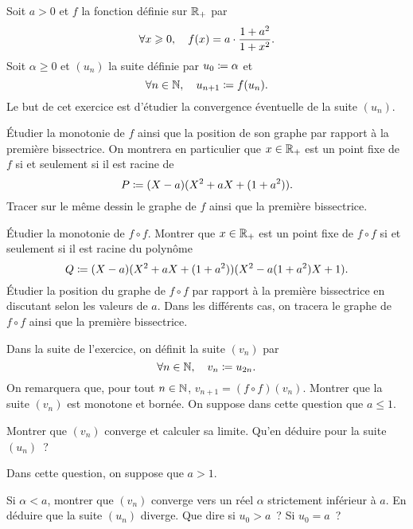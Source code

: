 \documentclass{magnolia}
\begin{document}
Soit $a>0$ et $f$ la fonction définie sur $\mathbb{R}_+$ par
\[\forall x\geqslant 0 ,\quad f(x)=a\cdot \frac{1+a^2}{1+x^2}.\]
Soit $\alpha\geq 0$ et $(u_n)$ la suite définie par $u_0\coloneqq\alpha$ et
\[\forall n\in\mathbb{N} ,\quad u_{n+1}\coloneqq f(u_n).\]
Le but de cet exercice est d'étudier la convergence éventuelle de la suite $(u_n)$.
\begin{questions}
\question 
  \begin{questions}
  \question Étudier la monotonie de $f$ ainsi que la position de son graphe par
    rapport à la première bissectrice. On montrera en particulier que
    $x\in\mathbb{R}_+$ est un point fixe de $f$ si et seulement si il est racine de
    \[P\coloneqq (X-a)(X^2+aX+(1+a^2)).\]
  \question Tracer sur le même dessin le graphe de $f$ ainsi que la première
    bissectrice.
  \end{questions}
\question 
  \begin{questions}
  \question Étudier la monotonie de $f\circ f$.
  \question Montrer que $x\in\mathbb{R}_+$ est un point fixe de $f\circ f$ si et
    seulement si il est racine du polynôme
    \[Q\coloneqq (X-a)(X^2+aX+(1+a^2))(X^2-a(1+a^2)X+1).\]
  \question Étudier la position du graphe de $f\circ f$ par rapport à la
    première bissectrice en discutant selon les valeurs de $a$. Dans les
    différents cas, on tracera le graphe de $f\circ f$ ainsi que la
    première bissectrice.
  \end{questions}
\enonce Dans la suite de l'exercice, on définit la suite $(v_n)$ par
  \[\forall n\in\mathbb{N} ,\quad v_n\coloneqq u_{2n}.\]
  On remarquera que, pour tout $n\in\mathbb{N}$, $v_{n+1}=(f\circ f)(v_n)$.
\question Montrer que la suite $(v_n)$ est monotone et bornée.
\question On suppose dans cette question que $a\leq 1$.
  \begin{questions}
  \question Montrer que $(v_n)$ converge et calculer sa limite.
  \question Qu'en déduire pour la suite $(u_n)$~?
  \end{questions}
\question Dans cette question, on suppose que $a>1$.
  \begin{questions}
  \question Si $\alpha<a$, montrer que $(v_n)$ converge vers un réel $\alpha$
    strictement inférieur à $a$. En déduire que la suite $(u_n)$ diverge.
  \question Que dire si $u_0>a$~? Si $u_0=a$~?
  \end{questions}
\end{questions}

\end{document}
